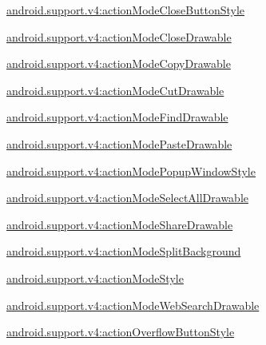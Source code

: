 {\ttfamily \hyperlink{classandroid_1_1support_1_1v4_1_1R_1_1styleable_a663f6400e9039cc3de0b0a345cc307d9}{android.\+support.\+v4\+:action\+Mode\+Close\+Button\+Style}}

{\ttfamily \hyperlink{classandroid_1_1support_1_1v4_1_1R_1_1styleable_a235b884d67d38c23c9ce1e69aa79c7cc}{android.\+support.\+v4\+:action\+Mode\+Close\+Drawable}}

{\ttfamily \hyperlink{classandroid_1_1support_1_1v4_1_1R_1_1styleable_a50471ef5cb2699d49ac3b144a6fbb0b4}{android.\+support.\+v4\+:action\+Mode\+Copy\+Drawable}}

{\ttfamily \hyperlink{classandroid_1_1support_1_1v4_1_1R_1_1styleable_abe3095e21e91f61195e7e499bed38e0e}{android.\+support.\+v4\+:action\+Mode\+Cut\+Drawable}}

{\ttfamily \hyperlink{classandroid_1_1support_1_1v4_1_1R_1_1styleable_aed5000c3e758ba19503acb4620d9059b}{android.\+support.\+v4\+:action\+Mode\+Find\+Drawable}}

{\ttfamily \hyperlink{classandroid_1_1support_1_1v4_1_1R_1_1styleable_aa4e5a97fc5aefa3e9414a786423d1a6f}{android.\+support.\+v4\+:action\+Mode\+Paste\+Drawable}}

{\ttfamily \hyperlink{classandroid_1_1support_1_1v4_1_1R_1_1styleable_ae15d1354af03ae1760e80c0083aed3b1}{android.\+support.\+v4\+:action\+Mode\+Popup\+Window\+Style}}

{\ttfamily \hyperlink{classandroid_1_1support_1_1v4_1_1R_1_1styleable_a74c31f8d65fcd2a018041d8588ae4fbc}{android.\+support.\+v4\+:action\+Mode\+Select\+All\+Drawable}}

{\ttfamily \hyperlink{classandroid_1_1support_1_1v4_1_1R_1_1styleable_a88501ea40bddb326cfe337c4c21f7488}{android.\+support.\+v4\+:action\+Mode\+Share\+Drawable}}

{\ttfamily \hyperlink{classandroid_1_1support_1_1v4_1_1R_1_1styleable_a3a8c8ba4a4bb7a3e1cb7b23f47caa2b1}{android.\+support.\+v4\+:action\+Mode\+Split\+Background}}

{\ttfamily \hyperlink{classandroid_1_1support_1_1v4_1_1R_1_1styleable_a971a9ca17c81aa97a72178cc5f548ec6}{android.\+support.\+v4\+:action\+Mode\+Style}}

{\ttfamily \hyperlink{classandroid_1_1support_1_1v4_1_1R_1_1styleable_a0f006cb9d33142dc621ea6ea9cd07941}{android.\+support.\+v4\+:action\+Mode\+Web\+Search\+Drawable}}

{\ttfamily \hyperlink{classandroid_1_1support_1_1v4_1_1R_1_1styleable_a3d2d5375ec6b6f4b8c965c1a321d256a}{android.\+support.\+v4\+:action\+Overflow\+Button\+Style}}

